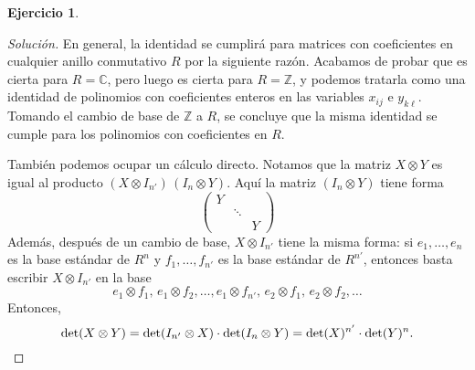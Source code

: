 \documentclass{article}
\newcounter{tarea}
\theoremstyle{definition}
\newtheorem{ejercicio}{Ejercicio}[tarea]
\newenvironment{solucion}{\begin{proof}[Solución]}{\end{proof}}
\newcommand{\ZZ}{\mathbb{Z}}
\newcommand{\CC}{\mathbb{C}}
\begin{document}
\begin{ejercicio}
\begin{solucion}
    En general, la identidad se cumplirá para matrices con coeficientes en
    cualquier anillo conmutativo $R$ por la siguiente razón. Acabamos de probar
    que es cierta para $R = \CC$, pero luego es cierta para $R = \ZZ$, y podemos
    tratarla como una identidad de polinomios con coeficientes enteros en las
    variables $x_{ij}$ e $y_{k\ell}$. Tomando el cambio de base de $\ZZ$ a $R$,
    se concluye que la misma identidad se cumple para los polinomios con
    coeficientes en $R$.

    \vspace{1em}

    También podemos ocupar un cálculo directo. Notamos que la matriz
    $X\otimes Y$ es igual al producto
    $(X\otimes I_{n'})\,(I_n\otimes Y)$. Aquí la matriz $(I_n\otimes Y)$
    tiene forma
    \[ \begin{pmatrix}
      Y \\
      & \ddots \\
      & & Y
    \end{pmatrix} \]
    Además, después de un cambio de base, $X\otimes I_{n'}$ tiene la misma forma:
    si $e_1,\ldots,e_n$ es la base estándar de $R^n$
    y $f_1,\ldots,f_{n'}$ es la base estándar de $R^{n'}$, entonces
    basta escribir $X\otimes I_{n'}$ en la base
    \[ e_1\otimes f_1, \, e_1\otimes f_2, \ldots, e_1\otimes f_{n'}, \, e_2\otimes f_1, \, e_2\otimes f_2, \ldots \]
    Entonces,
    \[ \det (X\otimes Y) = \det (I_{n'}\otimes X)\cdot \det (I_n\otimes Y)
    = \det (X)^{n'} \cdot \det (Y)^n. \qedhere \]
  \end{solucion}
  \fi
\end{ejercicio}
\end{document}
